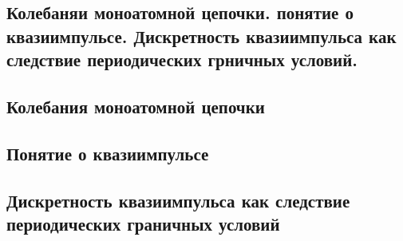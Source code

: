 \subsection{Колебаняи моноатомной цепочки. понятие о квазиимпульсе. Дискретность квазиимпульса как следствие периодических грничных условий.}
\subsection{Колебания моноатомной цепочки}
\subsection{Понятие о квазиимпульсе}
\subsection{Дискретность квазиимпульса как следствие периодических граничных условий}